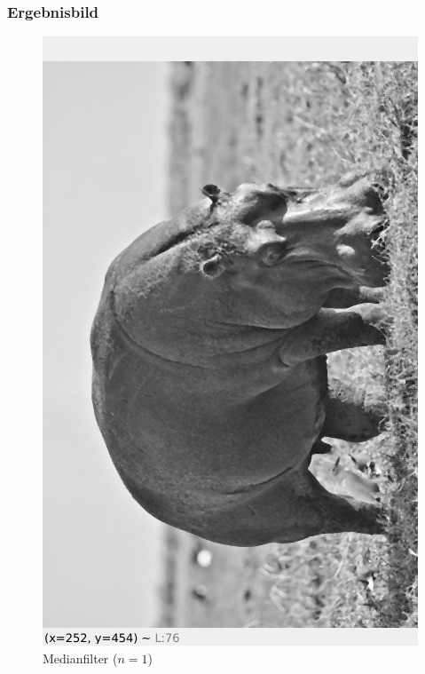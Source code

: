 \documentclass[12pt]{article}
\begin{document}
\subsubsection*{Ergebnisbild}
\begin{figure}[H]
  \centering
  \begin{minipage}{0.49\textwidth}
    \centering
    \includegraphics[width=\textwidth, height=0.6\textheight, keepaspectratio]{median_1.png}
    Medianfilter ($n = 1$)
  \end{minipage}
\end{figure}
\end{document}
